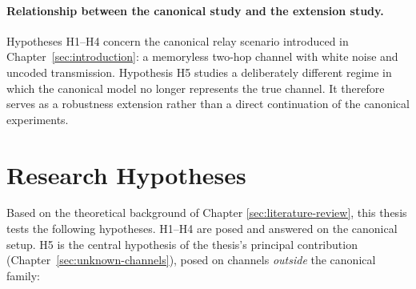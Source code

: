 \paragraph{Relationship between the canonical study and the extension study.} Hypotheses H1--H4 concern the canonical relay scenario introduced in Chapter~\ref{sec:introduction}: a memoryless two-hop channel with white noise and uncoded transmission. Hypothesis H5 studies a deliberately different regime in which the canonical model no longer represents the true channel. It therefore serves as a robustness extension rather than a direct continuation of the canonical experiments.

\section{Research Hypotheses}\label{sec:research-hypotheses}

Based on the theoretical background of Chapter \ref{sec:literature-review}, this thesis tests the following hypotheses. H1--H4 are posed and answered on the canonical setup. H5 is the central hypothesis of the thesis's principal contribution (Chapter~\ref{sec:unknown-channels}), posed on channels \emph{outside} the canonical family:

